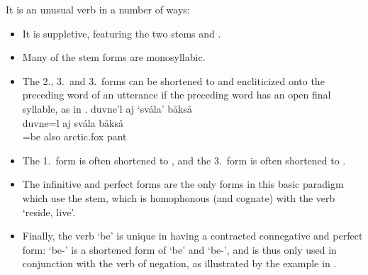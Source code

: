 It is an unusual verb in a number of ways: \begin{itemize}
\item It is suppletive, featuring the two stems  and . 
\item Many of the  stem forms are monosyllabic. 
\item The 2\SGs.\PRSs, 3\SGs.\PRSs\ and 3\PLs.\PRSs\ forms can be shortened to  and encliticized onto the preceding word of an utterance if the preceding word has an open final syllable, as in .
\ea\label{cliticBE}
\glll	duvne'l aj ‘svála’ båkså\\
	duvne=l aj svála båkså\\
	=be\BS{} also arctic.fox\BS{} pant\BS{}\\
	
\z
{}
\item The 1\SGs.\PSTs\ form  is often shortened to , and the 3\PLs.\PSTs\ form  is often shortened to . 
\item The infinitive and perfect forms are the only forms in this basic paradigm which use the  stem, %
which is homophonous (and cognate) with the verb  ‘reside, live’. 
\item Finally, the verb  ‘be’ is unique in having a contracted connegative and perfect form:  ‘be-\BS{}’ is a shortened form of  ‘be\BS{}’ and  ‘be-’, and is thus only used in conjunction with the verb of negation, as illustrated by the example in . 

\end{itemize}
